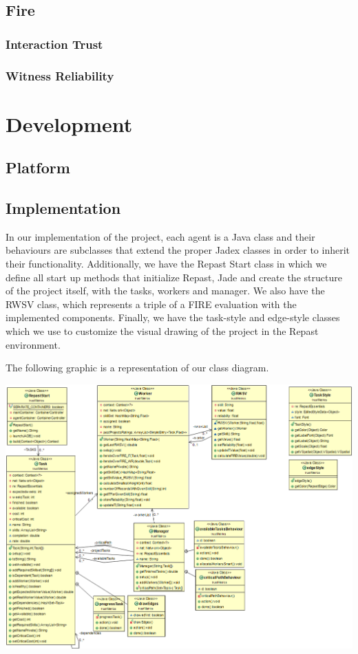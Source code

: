 \documentclass[paper=a4, fontsize=11pt]{scrartcl} %
\numberwithin{equation}{section} %
\numberwithin{figure}{section} %
\numberwithin{table}{section} %
\begin{document}
\subsection{Fire}

\subsubsection{Interaction Trust}
\subsubsection{Witness Reliability}

\section{Development}

\subsection{Platform}

\subsection{Implementation}
In our implementation of the project, each agent is a Java class and their behaviours are subclasses that extend the proper Jadex classes in order to inherit their functionality. Additionally, we have the Repast Start class in which we define all start up methods that initialize Repast, Jade and create the structure of the project itself, with the tasks, workers and manager. We also have the RWSV class, which represents a triple of a FIRE evaluation with the implemented components. Finally, we have the task-style and edge-style classes which we use to customize the visual drawing of the project in the Repast environment.

The following graphic is a representation of our class diagram.
\begin{center}
	\includegraphics[scale=0.4]{Model.png}
\end{center}
\end{document}
